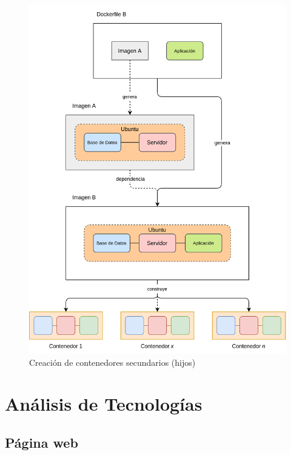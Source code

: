                 \begin{figure}[!htbp]
                    \centering
                    \includegraphics[scale=0.14]{images/Diagramas/Contenedor B.png}
                    \caption{Creación de contenedores secundarios (hijos)}
                    \label{fig:contenedor-hijo}
                \end{figure}
                
                \newpage


    
    \section{Análisis de Tecnologías}
        
        \subsection{Página web}

